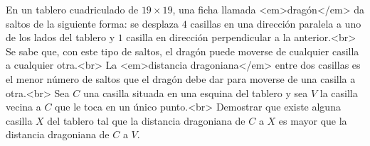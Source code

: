 En un tablero cuadriculado de $19 \times 19$, una ficha llamada <em>dragón</em> da saltos de la siguiente forma: se desplaza $4$ casillas en una dirección paralela a uno de los lados del tablero y $1$ casilla en dirección perpendicular a la anterior.<br>
Se sabe que, con este tipo de saltos, el dragón puede moverse de cualquier casilla a cualquier otra.<br>
La <em>distancia dragoniana</em> entre dos casillas es el menor número de saltos que el dragón debe dar para moverse de una casilla a otra.<br>
Sea $C$ una casilla situada en una esquina del tablero y sea $V$ la casilla vecina a $C$ que le toca en un único punto.<br>
Demostrar que existe alguna casilla $X$ del tablero tal que la distancia dragoniana de $C$ a $X$ es mayor que la distancia dragoniana de $C$ a $V$.
